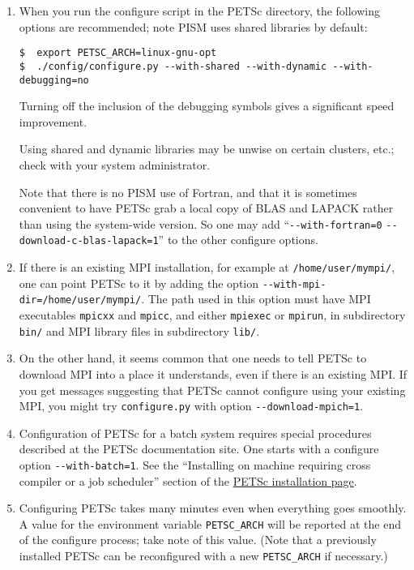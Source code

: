 \documentclass[11pt,final]{amsart}
\newcommand{\und}{\_\!\_}
\begin{document}
\begin{enumerate}
\begin{enumerate}
\item When you run the configure script in the PETSc directory, the following options are recommended; note PISM uses shared libraries by default:\index{PETSC\und ARCH}
\begin{verbatim}
$  export PETSC_ARCH=linux-gnu-opt
$  ./config/configure.py --with-shared --with-dynamic --with-debugging=no
\end{verbatim}

Turning off the inclusion of the debugging symbols gives a significant speed improvement.

Using shared and dynamic libraries may be unwise on certain clusters, etc.; check with your system administrator.

Note that there is no PISM use of Fortran, and that it is sometimes convenient to have PETSc grab a local copy of BLAS and LAPACK rather than using the system-wide version.  So one may add ``\verb|--with-fortran=0| \verb|--download-c-blas-lapack=1|'' to the other configure options.

\item If there is an existing MPI installation, for example at \verb|/home/user/mympi/|, one can point PETSc to it by adding the option \verb|--with-mpi-dir=/home/user/mympi/|.  The path used in this option must have MPI executables \verb|mpicxx| and \verb|mpicc|, and either \verb|mpiexec| or \verb|mpirun|, in subdirectory \verb|bin/| and MPI library files in subdirectory \verb|lib/|.

\item On the other hand, it seems common that one needs to tell PETSc to download MPI into a place it understands, even if there is an existing MPI.  If you get messages suggesting that PETSc cannot configure using your existing MPI, you might try \verb|configure.py| with option \verb|--download-mpich=1|.

\item Configuration of PETSc for a batch system requires special procedures described at the PETSc documentation site.  One starts with a configure option \verb|--with-batch=1|.  See the ``Installing on machine requiring cross compiler or a job scheduler'' section of the \href{http://www-unix.mcs.anl.gov/petsc/petsc-2/documentation/installation.html}{PETSc installation page}.

\item  Configuring PETSc takes many minutes even when everything goes smoothly.   A value for the environment variable \verb|PETSC_ARCH| will be reported at the end of the configure process; take note of this value.  (Note that a previously installed PETSc can be reconfigured with a new \verb|PETSC_ARCH| if necessary.)


\end{enumerate}
\end{enumerate}
\end{document}
